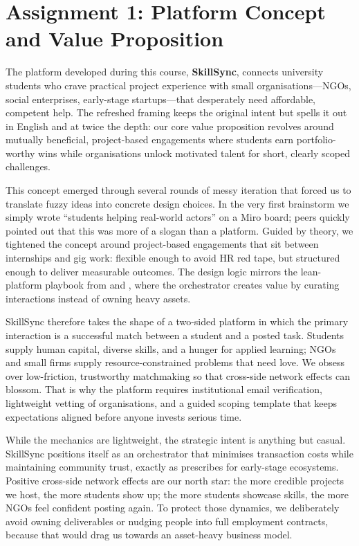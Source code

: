 \section*{Assignment 1: Platform Concept and Value Proposition}

The platform developed during this course, \textbf{SkillSync}, connects university students who crave practical project experience with small organisations---NGOs, social enterprises, early-stage startups---that desperately need affordable, competent help. The refreshed framing keeps the original intent but spells it out in English and at twice the depth: our core value proposition revolves around mutually beneficial, project-based engagements where students earn portfolio-worthy wins while organisations unlock motivated talent for short, clearly scoped challenges.

This concept emerged through several rounds of messy iteration that forced us to translate fuzzy ideas into concrete design choices. In the very first brainstorm we simply wrote ``students helping real-world actors'' on a Miro board; peers quickly pointed out that this was more of a slogan than a platform. Guided by theory, we tightened the concept around project-based engagements that sit between internships and gig work: flexible enough to avoid HR red tape, but structured enough to deliver measurable outcomes. The design logic mirrors the lean-platform playbook from \citet{Choudary2016} and \citet{Srnicek2017}, where the orchestrator creates value by curating interactions instead of owning heavy assets.

SkillSync therefore takes the shape of a two-sided platform in which the primary interaction is a successful match between a student and a posted task. Students supply human capital, diverse skills, and a hunger for applied learning; NGOs and small firms supply resource-constrained problems that need love. We obsess over low-friction, trustworthy matchmaking so that cross-side network effects can blossom. That is why the platform requires institutional email verification, lightweight vetting of organisations, and a guided scoping template that keeps expectations aligned before anyone invests serious time.

While the mechanics are lightweight, the strategic intent is anything but casual. SkillSync positions itself as an orchestrator that minimises transaction costs while maintaining community trust, exactly as \citet{Reillier2017} prescribes for early-stage ecosystems. Positive cross-side network effects are our north star: the more credible projects we host, the more students show up; the more students showcase skills, the more NGOs feel confident posting again. To protect those dynamics, we deliberately avoid owning deliverables or nudging people into full employment contracts, because that would drag us towards an asset-heavy business model.

